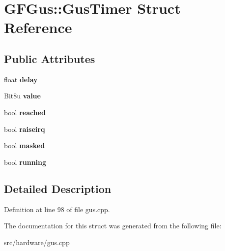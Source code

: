 \hypertarget{structGFGus_1_1GusTimer}{\section{G\-F\-Gus\-:\-:Gus\-Timer Struct Reference}
\label{structGFGus_1_1GusTimer}
}
\subsection*{Public Attributes}
\begin{DoxyCompactItemize}
\item 
\hypertarget{structGFGus_1_1GusTimer_aee952ea33d779a230a2652b5b7a0cac8}{float {\bfseries delay}}\label{structGFGus_1_1GusTimer_aee952ea33d779a230a2652b5b7a0cac8}

\item 
\hypertarget{structGFGus_1_1GusTimer_a31a1f93f014d45aef3fd61d0d5667481}{Bit8u {\bfseries value}}\label{structGFGus_1_1GusTimer_a31a1f93f014d45aef3fd61d0d5667481}

\item 
\hypertarget{structGFGus_1_1GusTimer_aef9e1ea5deb2d585b7f15eb62a89de85}{bool {\bfseries reached}}\label{structGFGus_1_1GusTimer_aef9e1ea5deb2d585b7f15eb62a89de85}

\item 
\hypertarget{structGFGus_1_1GusTimer_a4425a248a4b43b178b279f5a3e8a169c}{bool {\bfseries raiseirq}}\label{structGFGus_1_1GusTimer_a4425a248a4b43b178b279f5a3e8a169c}

\item 
\hypertarget{structGFGus_1_1GusTimer_ac033ff5008998588554e9319437e68a0}{bool {\bfseries masked}}\label{structGFGus_1_1GusTimer_ac033ff5008998588554e9319437e68a0}

\item 
\hypertarget{structGFGus_1_1GusTimer_a0cb384d64010c79f0a588b0ec81968e6}{bool {\bfseries running}}\label{structGFGus_1_1GusTimer_a0cb384d64010c79f0a588b0ec81968e6}

\end{DoxyCompactItemize}


\subsection{Detailed Description}


Definition at line 98 of file gus.\-cpp.



The documentation for this struct was generated from the following file\-:\begin{DoxyCompactItemize}
\item 
src/hardware/gus.\-cpp\end{DoxyCompactItemize}
